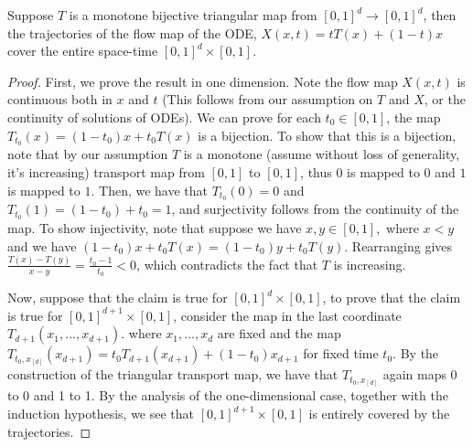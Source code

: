 \begin{proposition}
Suppose $T$ is a monotone bijective triangular map from $[0, 1]^d \rightarrow [0,1]^d$, then the trajectories of the flow map of the ODE, $X(x,t) = tT(x) + (1-t)x$ cover the entire space-time $[0,1]^d \times [0, 1]$.
\end{proposition}
\begin{proof}
First, we prove the result in one dimension. Note the flow map $X(x,t)$ is continuous both in $x$ and $t$ (This follows from our assumption on $T$ and $X$, or the continuity of solutions of ODEs). We can prove for each $t_0 \in [0,1]$, the map $T_{t_0}(x) = (1-t_0)x + t_0T(x)$ is a bijection. To show that this is a bijection, note that by our assumption $T$ is a monotone (assume without loss of generality, it's increasing) transport map from $[0,1]$ to $[0,1]$, thus $0$ is mapped to $0$ and $1$ is mapped to $1$. Then, we have that $T_{t_0}(0) = 0$ and $T_{t_0}(1) = (1-t_0) + t_0 = 1$, and surjectivity follows from the continuity of the map. To show injectivity, note that suppose we have $x, y\in[0,1],$ where $x<y$ and we have $(1-t_0)x + t_0T(x) = (1-t_0)y + t_0T(y)$. Rearranging gives $\frac{T(x) - T(y)}{x-y} = \frac{t_0-1}{t_0} < 0$, which contradicts the fact that $T$ is increasing.  

Now, suppose that the claim is true for $[0,1]^d \times [0,1]$, to prove that the claim is true for $[0,1]^{d+1} \times [0,1]$, consider the map in the last coordinate $T_{d+1}(x_1,...,x_{d+1})$. where $x_1,...,x_d$ are fixed and the map $T_{t_0, x_{[d]}}(x_{d+1}) = t_0T_{d+1}(x_{d+1}) + (1-t_0)x_{d+1}$ for fixed time $t_0$. By the construction of the triangular transport map, we have that $T_{t_0, x_{[d]}}$ again maps 0 to 0 and 1 to 1. By the analysis of the one-dimensional case, together with the induction hypothesis, we see that $[0,1]^{d+1} \times [0,1]$ is entirely covered by the trajectories.
\end{proof}

